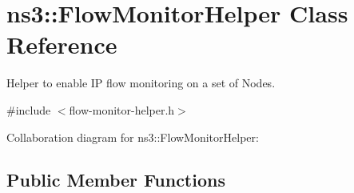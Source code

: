 \hypertarget{classns3_1_1FlowMonitorHelper}{}\section{ns3\+:\+:Flow\+Monitor\+Helper Class Reference}
\label{classns3_1_1FlowMonitorHelper}


Helper to enable IP flow monitoring on a set of Nodes.  




{\ttfamily \#include $<$flow-\/monitor-\/helper.\+h$>$}



Collaboration diagram for ns3\+:\+:Flow\+Monitor\+Helper\+:
\subsection*{Public Member Functions}
